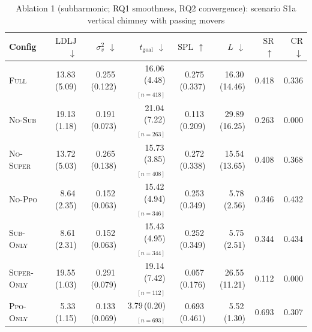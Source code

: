 \begin{table}[h]
\centering
\small
\caption{Ablation 1 (subharmonic; RQ1 smoothness, RQ2 convergence): scenario S1a vertical chimney with passing movers}
\label{tab:abl1:S1a_vertical_chimney_with_passing_movers}
\begin{tabular}{lrrrrrrr}
\toprule
Config & $\mathrm{LDLJ}$ $\downarrow$ & $\sigma^2_v$ $\downarrow$ & $t_{\mathrm{goal}}$ $\downarrow$ & $\mathrm{SPL}$ $\uparrow$ & $L$ $\downarrow$ & $\mathrm{SR}$ $\uparrow$ & $\mathrm{CR}$ $\downarrow$ \\
\midrule
\textsc{Full} & 13.83\,(5.09) & 0.255\,(0.122) & 16.06\,(4.48)$_{[n=418]}$ & 0.275\,(0.337) & 16.30\,(14.46) & 0.418 & 0.336 \\
\textsc{No-Sub} & 19.13\,(1.18) & 0.191\,(0.073) & 21.04\,(7.22)$_{[n=263]}$ & 0.113\,(0.209) & 29.89\,(16.25) & 0.263 & 0.000 \\
\textsc{No-Super} & 13.72\,(5.03) & 0.265\,(0.138) & 15.73\,(3.85)$_{[n=408]}$ & 0.272\,(0.338) & 15.54\,(13.65) & 0.408 & 0.368 \\
\textsc{No-Ppo} & 8.64\,(2.35) & 0.152\,(0.063) & 15.42\,(4.94)$_{[n=346]}$ & 0.253\,(0.349) & 5.78\,(2.56) & 0.346 & 0.432 \\
\textsc{Sub-Only} & 8.61\,(2.31) & 0.152\,(0.063) & 15.43\,(4.95)$_{[n=344]}$ & 0.252\,(0.349) & 5.75\,(2.51) & 0.344 & 0.434 \\
\textsc{Super-Only} & 19.55\,(1.03) & 0.291\,(0.079) & 19.14\,(7.42)$_{[n=112]}$ & 0.057\,(0.176) & 26.55\,(11.21) & 0.112 & 0.000 \\
\textsc{Ppo-Only} & 5.33\,(1.15) & 0.133\,(0.069) & 3.79\,(0.20)$_{[n=693]}$ & 0.693\,(0.461) & 5.52\,(1.30) & 0.693 & 0.307 \\
\bottomrule
\end{tabular}
\end{table}


